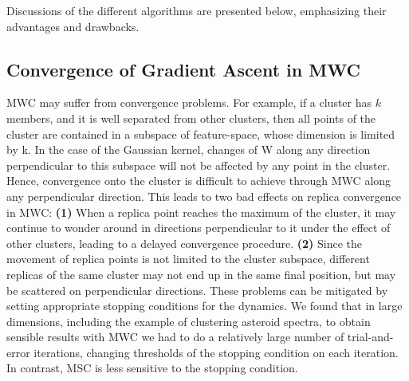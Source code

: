\documentclass[preprint,12pt]{elsarticle}
\begin{document}
Discussions of the different algorithms are presented below, emphasizing their advantages and drawbacks. 































\subsection{Convergence of Gradient Ascent in MWC}
\label{convergence}
MWC may suffer from convergence problems. For example, if a cluster has $k$ members, and it is well separated from other clusters, then all points of the cluster are contained in a subspace of feature-space, whose dimension is limited by k. In the case of the Gaussian kernel, changes of W along any direction perpendicular to this subspace will not be affected by any point in the cluster. Hence, convergence onto the cluster is difficult to achieve through MWC along any perpendicular direction.
This leads to two bad effects on replica convergence in
MWC: \textbf{(1)} When a replica point reaches the maximum of the cluster, it may continue to wonder around in directions perpendicular to it under the effect of other clusters, leading to a delayed convergence procedure. \textbf{(2)} Since the movement of replica points is not limited to the cluster subspace, different replicas of the same cluster may not end up in the same final position, but may be scattered on perpendicular directions.
These problems can be mitigated by setting appropriate stopping conditions for the dynamics. We found that in large dimensions, including the example of clustering asteroid spectra, to obtain sensible results with MWC we had to do a relatively large number of trial-and-error iterations, changing thresholds of the stopping condition on each iteration. In contrast, MSC is less sensitive to the stopping condition.
\end{document}
